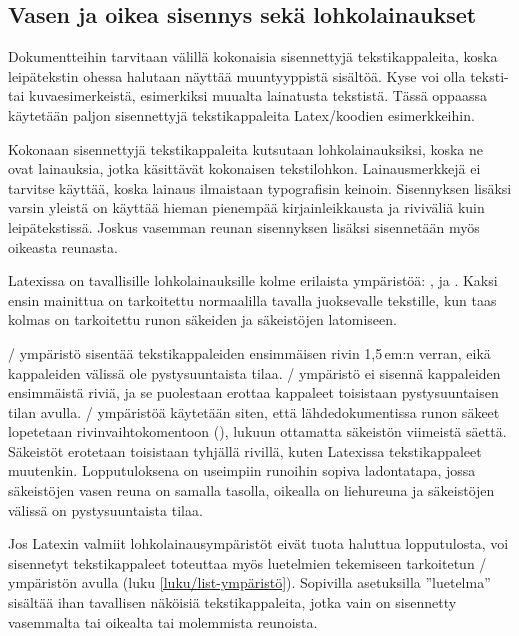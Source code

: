 \subsection{Vasen ja oikea sisennys sekä lohkolainaukset}
\label{luku/lohkolainaukset}

Dokumentteihin tarvitaan välillä kokonaisia sisennettyjä
tekstikappaleita, koska leipätekstin ohessa halutaan näyttää
muuntyyppistä sisältöä. Kyse voi olla teksti- tai kuvaesimerkeistä,
esimerkiksi muualta lainatusta tekstistä. Tässä oppaassa käytetään
paljon sisennettyjä tekstikappaleita Latex\-/koodien esimerkkeihin.

Kokonaan sisennettyjä tekstikappaleita kutsutaan lohkolainauksiksi,
koska ne ovat lainauksia, jotka käsittävät kokonaisen tekstilohkon.
Lainausmerkkejä ei tarvitse käyttää, koska lainaus ilmaistaan
typografisin keinoin. Sisennyksen lisäksi varsin yleistä on käyttää
hieman pienempää kirjainleikkausta ja riviväliä kuin leipätekstissä.
Joskus vasemman reunan sisennyksen lisäksi sisennetään myös oikeasta
reunasta.

Latexissa on tavallisille lohkolainauksille kolme erilaista ympäristöä:
,  ja . Kaksi
ensin mainittua on tarkoitettu normaalilla tavalla juoksevalle
tekstille, kun taas kolmas on tarkoitettu runon säkeiden ja säkeistöjen
latomiseen.

\-/ ympäristö sisentää tekstikappaleiden
ensimmäisen rivin 1,5\,em:n verran, eikä kappaleiden välissä ole
pystysuuntaista tilaa. \-/ ympäristö ei sisennä
kappaleiden ensimmäistä riviä, ja se puolestaan erottaa kappaleet
toisistaan pystysuuntaisen tilan avulla. \-/ ympäristöä
käytetään siten, että lähdedokumentissa runon säkeet lopetetaan
rivinvaihtokomentoon (\komento{\keno}), lukuun ottamatta säkeistön
viimeistä säettä. Säkeistöt erotetaan toisistaan tyhjällä rivillä, kuten
Latexissa tekstikappaleet muutenkin. Lopputuloksena on useimpiin
runoihin sopiva ladontatapa, jossa säkeistöjen vasen reuna on samalla
tasolla, oikealla on liehureuna ja säkeistöjen välissä on
pystysuuntaista tilaa.

Jos Latexin valmiit lohkolainausympäristöt eivät tuota haluttua
lopputulosta, voi sisennetyt tekstikappaleet toteuttaa myös luetelmien
tekemiseen tarkoitetun \-/ ympäristön avulla (luku
\ref{luku/list-ympäristö}). Sopivilla asetuksilla ''luetelma'' sisältää
ihan tavallisen näköisiä tekstikappaleita, jotka vain on sisennetty
vasemmalta tai oikealta tai molemmista reunoista.

